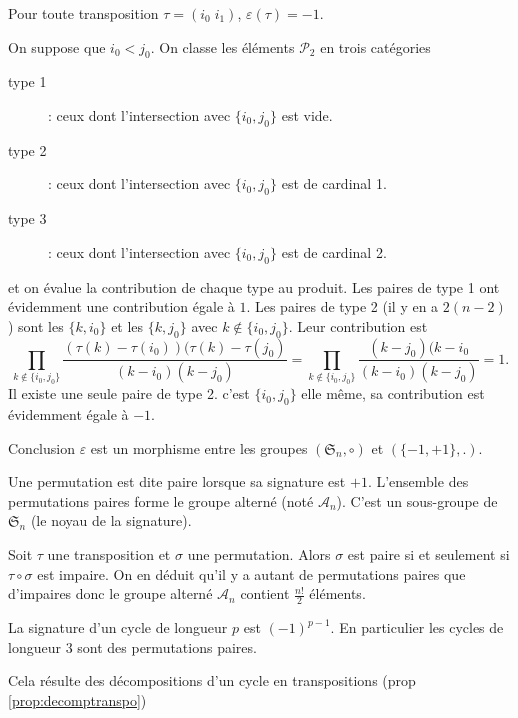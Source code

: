 \begin{propn}
 Pour toute transposition $\tau = (i_0\;i_1)$, $\varepsilon(\tau)=-1$.
\end{propn}
\begin{demo}
 On suppose que $i_0<j_0$. On classe les éléments  $\mathcal P_2$ en trois catégories
\begin{description}
 \item [type 1] : ceux dont l'intersection avec $\{i_0,j_0\}$ est vide.
\item [type 2] : ceux dont l'intersection avec $\{i_0,j_0\}$ est de cardinal 1.
\item [type 3] : ceux dont l'intersection avec $\{i_0,j_0\}$ est de cardinal 2.
\end{description}
et on évalue la contribution de chaque type au produit.\newline
Les paires de type 1 ont évidemment une contribution égale à $1$.\newline
Les paires de type 2 (il y en a $2(n-2)$) sont les $\{k,i_0\}$ et les $\{k,j_0\}$ avec $k\not\in\{i_0,j_0\}$. Leur contribution est
\begin{displaymath}
 \prod_{k\not\in\{i_0,j_0\}}\dfrac{(\tau(k)-\tau(i_0))(\tau(k)-\tau(j_0)}{(k-i_0)(k-j_0)}
=
 \prod_{k\not\in\{i_0,j_0\}}\dfrac{(k-j_0)(k-i_0}{(k-i_0)(k-j_0)} = 1.
\end{displaymath}
Il existe une seule paire de type 2. c'est $\{i_0,j_0\}$ elle même, sa contribution est évidemment égale à $-1$.
\end{demo}
Conclusion $\varepsilon$ est un morphisme entre les groupes $(\mathfrak S_n,\circ)$ et $(\{-1,+1\},.)$.
\begin{defi}
 Une permutation est dite paire lorsque sa signature est $+1$. L'ensemble des permutations paires forme le groupe alterné (noté $\mathcal A_n$). C'est un sous-groupe de $\mathfrak S_n$ (le noyau de la signature).
\end{defi}
\begin{rem}
 Soit $\tau$ une transposition et $\sigma$ une permutation. Alors $\sigma$ est paire si et seulement si $\tau \circ \sigma$ est impaire. On en déduit qu'il y a autant de permutations paires que d'impaires donc le groupe alterné $\mathcal A_n$ contient $\frac{n!}{2}$ éléments.
\end{rem}

\begin{propn}
 La signature d'un cycle de longueur $p$ est $(-1)^{p-1}$. En particulier les cycles de longueur $3$ sont des permutations paires.
\end{propn}
\begin{demo}
 Cela résulte des décompositions d'un cycle en transpositions (prop \ref{prop:decomptranspo})
\end{demo}


